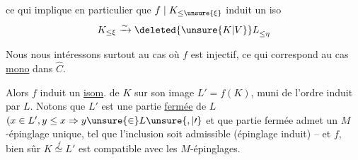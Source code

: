 ce qui implique en particulier que $f\mid K_{\leq\unsure{\xi}}$ induit un iso
\[
K_{\leq\xi}\xrightarrow{\sim}{\deleted{\unsure{K|V}}L}_{\leq\eta}
\]

Nous nous intéressons surtout au cas où $f$ est injectif, ce qui correspond au  cas  \uline{mono} dans $\widehat C$.

Alors $f$ induit un \uline{isom}. de $K$ sur  son image $L'=f(K)$, muni de l'ordre induit par $L$. Notons que $L'$ est une partie \uline{fermée} de $L$ $(x\in L',y\leq x\Rightarrow y\unsure{\in}L\unsure{,|\prime}$ et que  partie fermée admet un $M$-épinglage  unique, tel que l'inclusion soit admissible (épinglage induit) -- et   $f$, bien sûr $K\overset{f}{\simeq}L'$ est compatible avec les $M$-épinglages.
